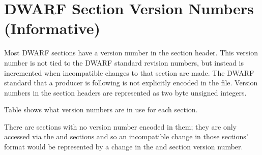 
\chapter[Section Version Numbers (Informative)]{DWARF Section Version Numbers (Informative)}
\label{app:dwarfsectionversionnumbersinformative}


Most DWARF sections have a version number in the section
header. This version number is not tied to the DWARF standard
revision numbers, but instead is incremented when incompatible
changes to that section are made. The DWARF standard that
a producer is following is not explicitly encoded in the
file. Version numbers in the section headers are represented
as two byte unsigned integers. 

Table 
shows what version
numbers are in use for each section.

There are sections with no version number encoded in them;
they are only accessed via the 
\dotdebuginfo{} and 
\dotdebugtypes{}
sections and so an incompatible change in those sections'
format would be represented by a change in the 
and \dotdebugtypes{} section version number.

